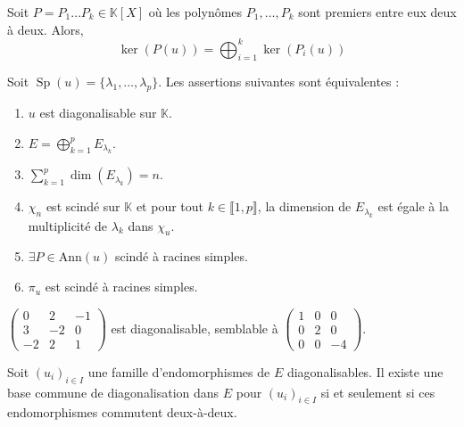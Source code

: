 	
	\begin{theorem}
		Soit $P = P_1 \dots P_k \in \mathbb{K}[X]$ où les polynômes $P_1, \dots, P_k$ sont premiers entre eux deux à deux. Alors,
		\[ \ker(P(u)) = \bigoplus_{i=1}^k \ker(P_i(u)) \]
	\end{theorem}
	
	
	\begin{theorem}
		Soit $\operatorname{Sp}(u) = \{ \lambda_1, \dots, \lambda_p \}$. Les assertions suivantes sont équivalentes :
		\begin{enumerate}[label=(\roman*)]
			\item $u$ est diagonalisable sur $\mathbb{K}$.
			\item $E = \bigoplus_{k=1}^p E_{\lambda_k}$.
			\item $\sum_{k=1}^p \dim(E_{\lambda_k}) = n$.
			\item $\chi_n$ est scindé sur $\mathbb{K}$ et pour tout $k \in \llbracket 1, p \rrbracket$, la dimension de $E_{\lambda_k}$ est égale à la multiplicité de $\lambda_k$ dans $\chi_u$.
			\item $\exists P \in \mathrm{Ann}(u)$ scindé à racines simples.
			\item $\pi_u$ est scindé à racines simples.
		\end{enumerate}
	\end{theorem}
	
	\reference[GOU21]{177}
	
	\begin{example}
		$\begin{pmatrix} 0 & 2 & -1 \\ 3 & -2 & 0 \\ -2 & 2 & 1 \end{pmatrix}$ est diagonalisable, semblable à $\begin{pmatrix} 1 & 0 & 0 \\ 0 & 2 & 0 \\ 0 & 0 & -4 \end{pmatrix}$.
	\end{example}
	
	\begin{theorem}
		Soit $(u_i)_{i \in I}$ une famille d'endomorphismes de $E$ diagonalisables. Il existe une base commune de diagonalisation dans $E$ pour $(u_i)_{i \in I}$ si et seulement si ces endomorphismes commutent deux-à-deux.
	\end{theorem}
	

